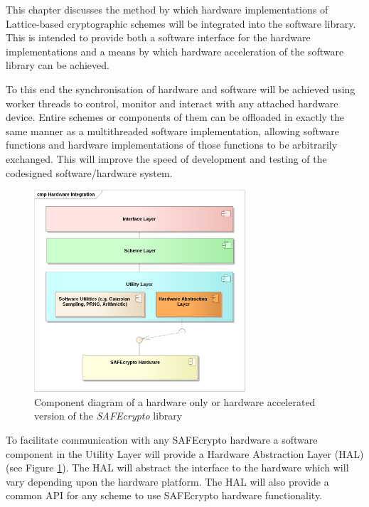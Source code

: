 This chapter discusses the method by which hardware implementations of Lattice-based cryptographic schemes will be integrated into the software library. This is intended to provide both a software interface for the hardware implementations and a means by which hardware acceleration of the software library can be achieved.

To this end the synchronisation of hardware and software will be achieved using worker threads to control, monitor and interact with any attached hardware device. Entire schemes or components of them can be offloaded in exactly the same manner as a multithreaded software implementation, allowing software functions and hardware implementations of those functions to be arbitrarily exchanged. This will improve the speed of development and testing of the codesigned software/hardware system.

\begin{figure}[h]
\centering
\includegraphics[width=0.7\textwidth]{hardware_integration.png}
\caption{Component diagram of a hardware only or hardware accelerated version of the \textit{SAFEcrypto} library}
\label{fig:safecrypto_hw_integration}
\end{figure}

To facilitate communication with any SAFEcrypto hardware a software component in the Utility Layer will provide a Hardware Abstraction Layer (HAL) (see Figure \ref{fig:safecrypto_hw_integration}). The HAL will abstract the interface to the hardware which will vary depending upon the hardware platform. The HAL will also provide a common API for any scheme to use SAFEcrypto hardware functionality.

